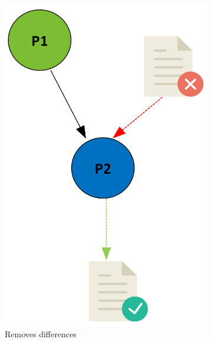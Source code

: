 \documentclass[a4paper,num-refs]{oup-contemporary}
\begin{document}
\begin{figure}
\begin{subfigure}{0.2\linewidth}
    \includegraphics[scale=0.3]{images/blue.png}
    \caption{Removes differences}
    \label{fig:blue}
    \end{subfigure}
    \hfill
    \begin{subfigure}{0.2\linewidth}

\end{subfigure}
\end{figure}
\end{document}

